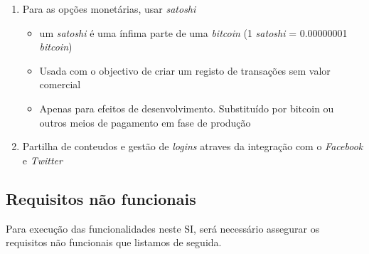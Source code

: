 \documentclass[12pt, a4paper, twoside]{report} %
\begin{document}
\begin{enumerate}
\item Para as opções monetárias, usar \textit{satoshi}
    \begin{itemize}
    \item um \textit{satoshi} é uma ínfima parte de uma \textit{bitcoin} (1 \textit{satoshi}	= 0.00000001 \textit{bitcoin})
    \item Usada com o objectivo de criar um registo de transações sem valor comercial
    \item Apenas para efeitos de desenvolvimento. Substituído por bitcoin ou outros meios de pagamento em fase de produção

    \end{itemize}
    
\item Partilha de conteudos e gestão de \textit{logins} atraves da integração com o \textit{Facebook} e \textit{Twitter}

\end{enumerate}



\subsection{Requisitos não funcionais}

Para execução das funcionalidades neste SI, será necessário assegurar os requisitos não funcionais que listamos de seguida.
\end{document}
